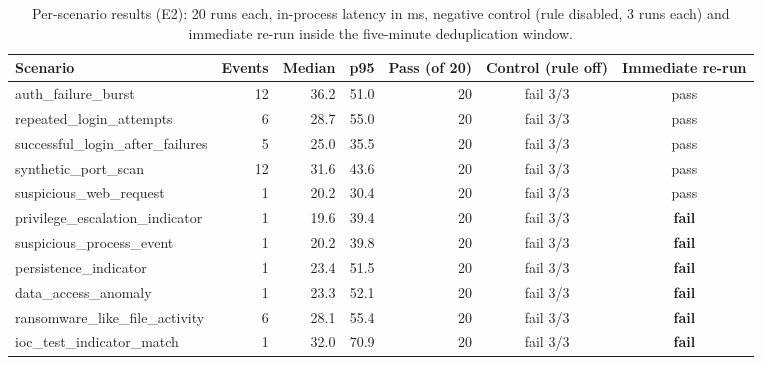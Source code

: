 \documentclass[conference]{IEEEtran}
\begin{document}
\begin{table}[t]
\caption{Per-scenario results (E2): 20 runs each, in-process latency in ms, negative control (rule disabled, 3 runs each) and immediate re-run inside the five-minute deduplication window.}
\label{tab:perscenario}
\centering
\footnotesize
\begin{tabular}{@{}l r r r r c c@{}}
\toprule
Scenario & Events & Median & p95 & Pass (of 20) & Control (rule off) & Immediate re-run \\
\midrule
auth\_failure\_burst & 12 & 36.2 & 51.0 & 20 & fail 3/3 & pass \\
repeated\_login\_attempts & 6 & 28.7 & 55.0 & 20 & fail 3/3 & pass \\
successful\_login\_after\_failures & 5 & 25.0 & 35.5 & 20 & fail 3/3 & pass \\
synthetic\_port\_scan & 12 & 31.6 & 43.6 & 20 & fail 3/3 & pass \\
suspicious\_web\_request & 1 & 20.2 & 30.4 & 20 & fail 3/3 & pass \\
privilege\_escalation\_indicator & 1 & 19.6 & 39.4 & 20 & fail 3/3 & \textbf{fail} \\
suspicious\_process\_event & 1 & 20.2 & 39.8 & 20 & fail 3/3 & \textbf{fail} \\
persistence\_indicator & 1 & 23.4 & 51.5 & 20 & fail 3/3 & \textbf{fail} \\
data\_access\_anomaly & 1 & 23.3 & 52.1 & 20 & fail 3/3 & \textbf{fail} \\
ransomware\_like\_file\_activity & 6 & 28.1 & 55.4 & 20 & fail 3/3 & \textbf{fail} \\
ioc\_test\_indicator\_match & 1 & 32.0 & 70.9 & 20 & fail 3/3 & \textbf{fail} \\
\bottomrule
\end{tabular}
\end{table}
\end{document}
